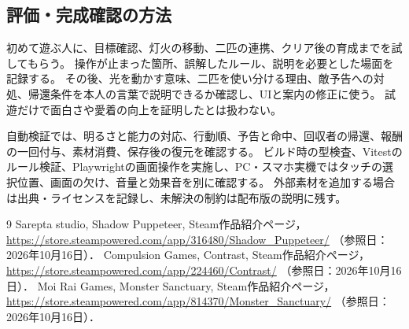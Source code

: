 \documentclass[a4paper,11pt,dvipdfmx]{jsarticle}
\begin{document}
\subsection{評価・完成確認の方法}
初めて遊ぶ人に、目標確認、灯火の移動、二匹の連携、クリア後の育成までを試してもらう。
操作が止まった箇所、誤解したルール、説明を必要とした場面を記録する。
その後、光を動かす意味、二匹を使い分ける理由、敵予告への対処、帰還条件を本人の言葉で説明できるか確認し、UIと案内の修正に使う。
試遊だけで面白さや愛着の向上を証明したとは扱わない。

自動検証では、明るさと能力の対応、行動順、予告と命中、回収者の帰還、報酬の一回付与、素材消費、保存後の復元を確認する。
ビルド時の型検査、Vitestのルール検証、Playwrightの画面操作を実施し、PC・スマホ実機ではタッチの選択位置、画面の欠け、音量と効果音を別に確認する。
外部素材を追加する場合は出典・ライセンスを記録し、未解決の制約は配布版の説明に残す。

\begin{thebibliography}{9}
Sarepta studio, Shadow Puppeteer, Steam作品紹介ページ，
\url{https://store.steampowered.com/app/316480/Shadow_Puppeteer/}
（参照日：2026年10月16日）．
Compulsion Games, Contrast, Steam作品紹介ページ，
\url{https://store.steampowered.com/app/224460/Contrast/}
（参照日：2026年10月16日）．
Moi Rai Games, Monster Sanctuary, Steam作品紹介ページ，
\url{https://store.steampowered.com/app/814370/Monster_Sanctuary/}
（参照日：2026年10月16日）．
\end{thebibliography}
\end{document}
